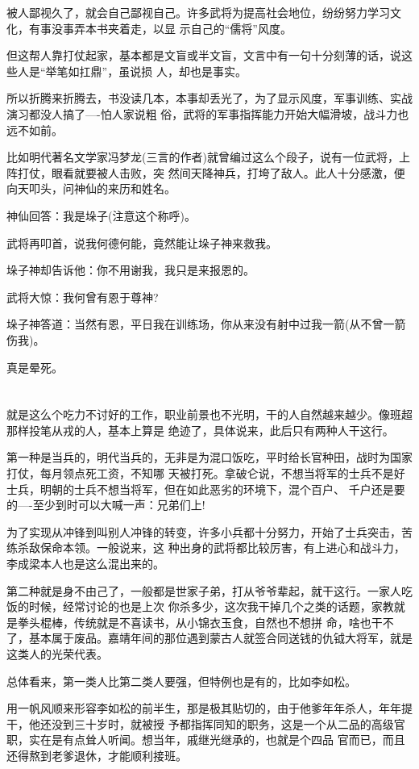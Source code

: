 \documentclass[11pt,a4paper,onecolumn]{article}
\begin{document}
被人鄙视久了，就会自己鄙视自己。许多武将为提高社会地位，纷纷努力学习文化，有事没事弄本书夹着走，以显
示自己的``儒将''风度。

但这帮人靠打仗起家，基本都是文盲或半文盲，文言中有一句十分刻薄的话，说这些人是``举笔如扛鼎''，虽说损
人，却也是事实。

所以折腾来折腾去，书没读几本，本事却丢光了，为了显示风度，军事训练、实战演习都没人搞了----怕人家说粗
俗，武将的军事指挥能力开始大幅滑坡，战斗力也远不如前。

比如明代著名文学家冯梦龙(三言的作者)就曾编过这么个段子，说有一位武将，上阵打仗，眼看就要被人击败，突
然间天降神兵，打垮了敌人。此人十分感激，便向天叩头，问神仙的来历和姓名。

神仙回答：我是垛子(注意这个称呼)。

武将再叩首，说我何德何能，竟然能让垛子神来救我。

垛子神却告诉他：你不用谢我，我只是来报恩的。

武将大惊：我何曾有恩于尊神?

垛子神答道：当然有恩，平日我在训练场，你从来没有射中过我一箭(从不曾一箭伤我)。

真是晕死。

\section[\thesection]{}

就是这么个吃力不讨好的工作，职业前景也不光明，干的人自然越来越少。像班超那样投笔从戎的人，基本上算是
绝迹了，具体说来，此后只有两种人干这行。

第一种是当兵的，明代当兵的，无非是为混口饭吃，平时给长官种田，战时为国家打仗，每月领点死工资，不知哪
天被打死。拿破仑说，不想当将军的士兵不是好士兵，明朝的士兵不想当将军，但在如此恶劣的环境下，混个百户、
千户还是要的----至少到时可以大喊一声：兄弟们上!

为了实现从冲锋到叫别人冲锋的转变，许多小兵都十分努力，开始了士兵突击，苦练杀敌保命本领。一般说来，这
种出身的武将都比较厉害，有上进心和战斗力，李成梁本人也是这么混出来的。

第二种就是身不由己了，一般都是世家子弟，打从爷爷辈起，就干这行。一家人吃饭的时候，经常讨论的也是上次
你杀多少，这次我干掉几个之类的话题，家教就是拳头棍棒，传统就是不喜读书，从小锦衣玉食，自然也不想拼
命，啥也干不了，基本属于废品。嘉靖年间的那位遇到蒙古人就签合同送钱的仇钺大将军，就是这类人的光荣代表。

总体看来，第一类人比第二类人要强，但特例也是有的，比如李如松。

用一帆风顺来形容李如松的前半生，那是极其贴切的，由于他爹年年杀人，年年提干，他还没到三十岁时，就被授
予都指挥同知的职务，这是一个从二品的高级官职，实在是有点耸人听闻。想当年，戚继光继承的，也就是个四品
官而已，而且还得熬到老爹退休，才能顺利接班。
\end{document}
